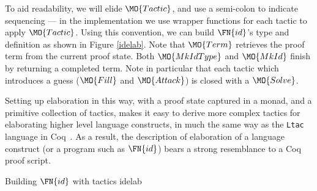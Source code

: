 To aid readability, we will elide $\MO{Tactic}$, and use a semi-colon to indicate
sequencing --- in the implementation we use wrapper functions for each tactic to
apply $\MO{Tactic}$.
Using this convention, we can build $\FN{id}$'s type and definition as shown
in Figure \ref{idelab}. Note that $\MO{Term}$ retrieves the proof term from the current proof
state. Both $\MO{MkIdType}$ and $\MO{MkId}$ finish by returning a completed \TT{} term.
Note in particular that each tactic which introduces a guess ($\MO{Fill}$ 
and $\MO{Attack}$) is closed with a $\MO{Solve}$.

Setting up elaboration in this way, with a proof state captured in a monad,
and a primitive collection of tactics, makes it easy to derive more complex
tactics for elaborating higher level language constructs, in much the same way
as the \texttt{Ltac} language in Coq~\cite{Delahaye2000}. As a result, the
description of elaboration of a language construct (or a program such as
$\FN{id}$) bears a strong resemblance to
a Coq proof script.

{Building $\FN{id}$ with tactics}
{idelab}


                             

